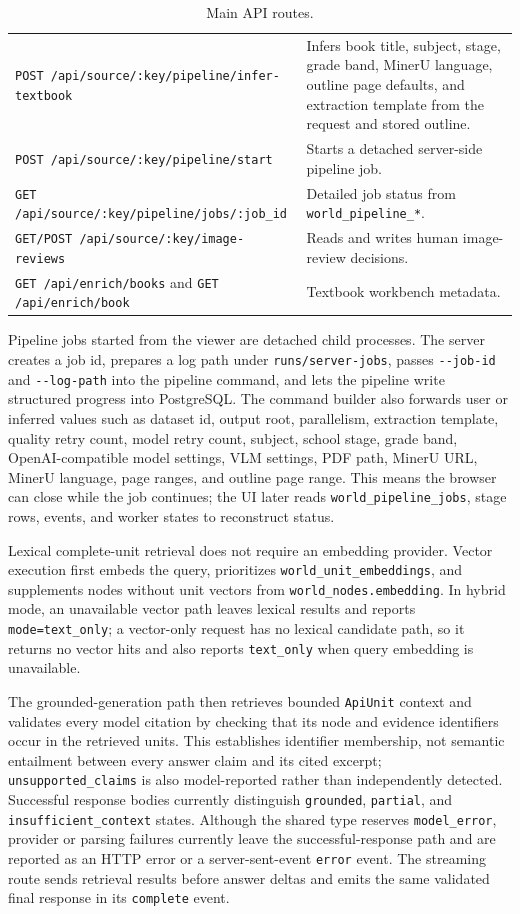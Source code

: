 \documentclass[11pt,letterpaper]{article}
\newcommand{\code}[1]{\nolinkurl{#1}}
\begin{document}
\begin{table}[H]
\begin{tabularx}{\textwidth}{@{}lY@{}}
\code{POST /api/source/:key/pipeline/infer-textbook} & Infers book title, subject, stage, grade band, MinerU language, outline page defaults, and extraction template from the request and stored outline.\\
\code{POST /api/source/:key/pipeline/start} & Starts a detached server-side pipeline job.\\
\code{GET /api/source/:key/pipeline/jobs/:job_id} & Detailed job status from \code{world_pipeline_*}.\\
\code{GET/POST /api/source/:key/image-reviews} & Reads and writes human image-review decisions.\\
\code{GET /api/enrich/books} and \code{GET /api/enrich/book} & Textbook workbench metadata.\\
\bottomrule
\end{tabularx}
\caption{Main API routes.}
\end{table}

Pipeline jobs started from the viewer are detached child processes. The server creates a job id, prepares a log path under \code{runs/server-jobs}, passes \code{--job-id} and \code{--log-path} into the pipeline command, and lets the pipeline write structured progress into PostgreSQL. The command builder also forwards user or inferred values such as dataset id, output root, parallelism, extraction template, quality retry count, model retry count, subject, school stage, grade band, OpenAI-compatible model settings, VLM settings, PDF path, MinerU URL, MinerU language, page ranges, and outline page range. This means the browser can close while the job continues; the UI later reads \code{world_pipeline_jobs}, stage rows, events, and worker states to reconstruct status.

Lexical complete-unit retrieval does not require an embedding provider. Vector execution first embeds the query, prioritizes \code{world_unit_embeddings}, and supplements nodes without unit vectors from \code{world_nodes.embedding}. In hybrid mode, an unavailable vector path leaves lexical results and reports \code{mode=text_only}; a vector-only request has no lexical candidate path, so it returns no vector hits and also reports \code{text_only} when query embedding is unavailable.

The grounded-generation path then retrieves bounded \code{ApiUnit} context and validates every model citation by checking that its node and evidence identifiers occur in the retrieved units. This establishes identifier membership, not semantic entailment between every answer claim and its cited excerpt; \code{unsupported_claims} is also model-reported rather than independently detected. Successful response bodies currently distinguish \code{grounded}, \code{partial}, and \code{insufficient_context} states. Although the shared type reserves \code{model_error}, provider or parsing failures currently leave the successful-response path and are reported as an HTTP error or a server-sent-event \code{error} event. The streaming route sends retrieval results before answer deltas and emits the same validated final response in its \code{complete} event.
\end{document}
